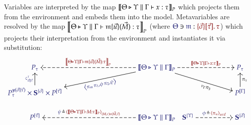 \documentclass[11pt]{article}
\theoremstyle{definition}
\theoremstyle{remark}
\numberwithin{equation}{section}
\begin{document}
Variables are interpreted by the map
${\left\llbracket
  \Theta\triangleright\Upsilon\parallel\Gamma\vdash x:\tau
\right\rrbracket}_{P}$ which
projects them from the environment and embeds them into the model. Metavariables
are resolved by the map
${\left\llbracket
  \Theta\triangleright\Upsilon\parallel\Gamma\vdash\mathfrak{m}\{\vec{u}\}(\vec{M})
  : \tau
\right\rrbracket}_{P}$ (where
$\Lookup{\Theta}{\MV{m}}{\MkValence{\vec{\sigma}}{\vec{\tau}}{\tau}}$) which
projects their interpretation from the environment and instantiates it via
substitution:
\[
  \begin{tikzcd}[cramped, ampersand replacement = \&]
    {\IMode{P_\tau}}
\&[8.0em]
    {\IMode{
      {\SemBrackets{
        \Theta\triangleright\Upsilon\parallel\Gamma
      }}_{P}
    }}
      \arrow[
        , rr
        , dashed
        , "
          \OMode{
            {\SemBrackets{
              \Theta\triangleright\Upsilon\parallel\Gamma
              \vdash
              x:\tau
            }}_{P}
          }
          "
      ]
      \ar{drr}[
        , rotate = -16.5
        , xshift = +1.5em
        , yshift = -0.2em
        , swap
      ]{
        {\nu}_{\Gamma} {\pi}_{3}
      }
      \ar{dl}[
        , rotate = +11.5
        , xshift = -2.75em
      ]{
        \IMode{
          \Tuple{
            \pi_\MV{m}\,
            \pi_1,
            \phi\,
            \pi_2,
            \psi
          }
        }
      }
      \arrow[
        , l
        , dashed
        , swap
        , "
          \OMode{
            {\SemBrackets{
              \Theta\triangleright\Upsilon\parallel\Gamma
              \vdash
              \MApp{\MV{m}}{\vec{u}}{\vec{M}}: \tau
            }}_{P}
          }"
      ]
\&[-2.0em]
    \null
\&[+3.0em]
    {\IMode{P_\tau}}
\\
    {\IMode{
      {P}_{\tau}^{
        \Yoneda{\vec{\sigma}\parallel\vec{\tau}}
      }
      \times \SymPsh^{\{\vec{\sigma}\}}
      \times P^{[\vec{\tau}]}
    }}
      \arrow[
        , u
        , "
          \IMode{
            \varsigma^\tau_{\vec{\sigma}\parallel\vec{\tau}}
          }
          "
        ]
\&
    \null
\&
    \null
\&
    {\IMode{P^{[\Gamma]}}}
      \arrow[
        , u
        , swap
        , "{\pi}_{x}"
      ]
\\
    {\IMode{P^{[\vec{\tau}]}}}
\&
    {\IMode{
      {\SemBrackets{
        \Theta\triangleright\Upsilon\parallel\Gamma
      }}_{P}
    }}
      \arrow[
        , dashed
        , l
        , swap
        , "
          \Define{
            \psi\,
          }{
            \,\Tuple{
              {\SemBrackets{
                \Theta\triangleright\Upsilon\parallel\Gamma\vdash M:\tau
              }}_{P}
            }_{(M,\tau)\in (\vec{M},\vec{\tau})}
          }
          "]
\&
    {\IMode{\SymPsh^{\{\Upsilon\}}}}
      \arrow[
        , dashed
        , r
        , "\Define{\phi\,}{\,\Tuple{\pi_u}_{u\in\vec{u}}}"
      ]
\&
    {\IMode{\SymPsh^{\{\vec{\sigma}\}}}}
  \end{tikzcd}
\]
\end{document}
